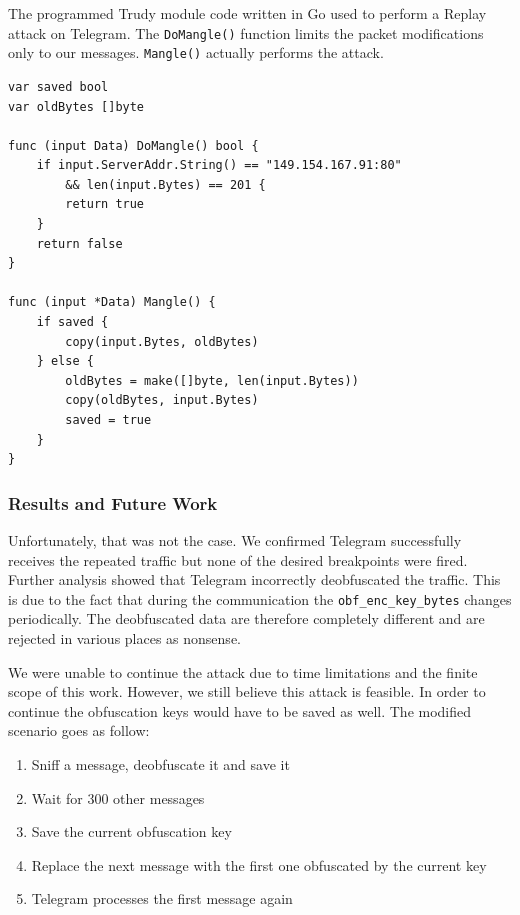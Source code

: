 \documentclass[thesis=M,english]{FITthesis}[2012/10/20]
\begin{document}
\begin{listing}[htb]
\caption{The programmed Trudy module code written in Go used to perform a Replay attack on Telegram. The \texttt{DoMangle()} function limits the packet modifications only to our messages. \texttt{Mangle()} actually performs the attack.}
\label{lst:analysis-replay-module}
\begin{verbatim}
var saved bool
var oldBytes []byte

func (input Data) DoMangle() bool {
	if input.ServerAddr.String() == "149.154.167.91:80"
		&& len(input.Bytes) == 201 {
		return true
	}
	return false
}

func (input *Data) Mangle() {
	if saved {
		copy(input.Bytes, oldBytes)
	} else {
		oldBytes = make([]byte, len(input.Bytes))
		copy(oldBytes, input.Bytes)
		saved = true
	}
}
\end{verbatim}
\end{listing}


\subsubsection{Results and Future Work}

Unfortunately, that was not the case. We confirmed Telegram successfully  receives the repeated traffic but none of the desired breakpoints were fired. Further analysis showed that Telegram incorrectly deobfuscated the traffic. This is due to the fact that during the communication the \texttt{obf\_enc\_key\_bytes} changes periodically. The deobfuscated data are therefore completely different and are rejected in various places as nonsense.

We were unable to continue the attack due to time limitations and the finite scope of this work. However, we still believe this attack is feasible. In order to continue the obfuscation keys would have to be saved as well. The modified scenario goes as follow:

\begin{enumerate}
	\item Sniff a message, deobfuscate it and save it
	\item Wait for 300 other messages
	\item Save the current obfuscation key
	\item Replace the next message with the first one obfuscated by the current key
	\item Telegram processes the first message again
\end{enumerate}
\end{document}
